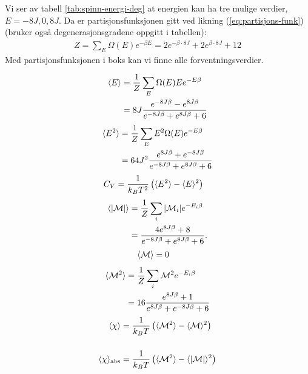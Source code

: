 \documentclass[11pt]{article}
\begin{document}
Vi ser av tabell \ref{tab:spinn-energi-deg} at energien kan ha tre
mulige verdier, $E = -8J,0,8J$. Da er partisjonsfunksjonen gitt ved
likning (\ref{eq:partisjons-funk}) (bruker også degenerasjonsgradene
oppgitt i tabellen):
\begin{align}
  Z = \sum_E \Omega(E)e^{-\beta E} = 2e^{-\beta \cdot 8J} + 2e^{\beta
  \cdot 8J} + 12\label{eq:partisjons-funk-2x2}
\end{align}
Med partisjonsfunksjonen i boks kan vi finne alle forventningsverdier.

\begin{align}
\begin{split}
  \langle E \rangle &= \frac{ 1 }{ Z }\sum_E \Omega(E) E e^{-E\beta}\\
           &= 8J \frac{ e^{-8J\beta}  - e^{8J\beta}}{ e^{-8J\beta}
             + e^{8J\beta} + 6}\label{eq:mean-E-2x2}
\end{split}
\end{align}
\begin{align}
\begin{split}
  \langle E^2 \rangle &= \frac{ 1 }{ Z }\sum_E E^2\Omega(E)e^{-E\beta}\\
  &= 64J^2 \frac{ e^{8J\beta} + e^{-8J\beta} }{ e^{-8J\beta} +
    e^{8J\beta} + 6 }\label{eq:mean-E2-2x2}
\end{split}
\end{align}
\begin{align}
  C_V &= \frac{ 1}{k_BT^2} \left( \langle E^2 \rangle - \langle E \rangle^2
        \right)\label{eq:mean-C-2x2}
\end{align}
\begin{align}
\begin{split}
  \langle |\mathcal{M}| \rangle &= \frac{ 1 }{ Z }\sum_i |\mathcal{M}_i| e^{-E_i\beta}\\
  &= \frac{ 4e^{8J\beta} + 8  }{ e^{-8J\beta} + e^{8J\beta} + 6 }.\label{eq:mean-abs-M-2x2}
\end{split}
\end{align}
\begin{align}
\langle \mathcal{M} \rangle &= 0\label{eq:mean-M-2x2}
\end{align}
\begin{align}
\begin{split}
  \langle \mathcal{M}^2 \rangle &= \frac{ 1 }{ Z } \sum_i \mathcal{M}^2
  e^{-E_i\beta}\\
  &= 16 \frac{ e^{8J\beta} + 1 }{ e^{8J\beta} + e^{-8J\beta}+6 }\label{eq:mean-M2-2x2}
\end{split}
\end{align}
\begin{align}
\langle \chi \rangle &= \frac{ 1 }{ k_B T} \left(
              \langle \mathcal{M}^2 \rangle-\langle \mathcal{M} \rangle^2
              \right)\label{eq:mean-chi-2x2}\\[0.5cm]
\langle \chi \rangle_\text{abs} &= \frac{ 1 }{ k_B T} \left( \langle \mathcal{M}^2 \rangle-\langle \mathcal{|M|} \rangle^2 \right)\label{eq:mean-chi-2x2-abs}
\end{align}
\end{document}
